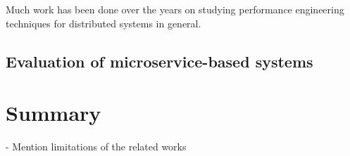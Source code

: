 Much work has been done over the years on studying performance engineering techniques for distributed systems in general.

\subsection{Evaluation of microservice-based systems}


\section{Summary}

- Mention limitations of the related works
